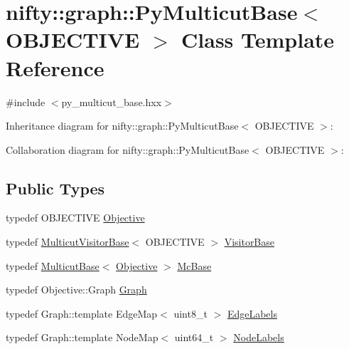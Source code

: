 \hypertarget{classnifty_1_1graph_1_1PyMulticutBase}{}\section{nifty\+:\+:graph\+:\+:Py\+Multicut\+Base$<$ O\+B\+J\+E\+C\+T\+I\+V\+E $>$ Class Template Reference}
\label{classnifty_1_1graph_1_1PyMulticutBase}


{\ttfamily \#include $<$py\+\_\+multicut\+\_\+base.\+hxx$>$}



Inheritance diagram for nifty\+:\+:graph\+:\+:Py\+Multicut\+Base$<$ O\+B\+J\+E\+C\+T\+I\+V\+E $>$\+:


Collaboration diagram for nifty\+:\+:graph\+:\+:Py\+Multicut\+Base$<$ O\+B\+J\+E\+C\+T\+I\+V\+E $>$\+:
\subsection*{Public Types}
\begin{DoxyCompactItemize}
\item 
typedef O\+B\+J\+E\+C\+T\+I\+V\+E \hyperlink{classnifty_1_1graph_1_1PyMulticutBase_ab2111d845c2163c0a7a4d9cccbe18458}{Objective}
\item 
typedef \hyperlink{namespacenifty_1_1graph_a33375e819f3dda82c6458bdc3cfbe81a}{Multicut\+Visitor\+Base}$<$ O\+B\+J\+E\+C\+T\+I\+V\+E $>$ \hyperlink{classnifty_1_1graph_1_1PyMulticutBase_ab8e429d9af32f127a62a886c523600e4}{Visitor\+Base}
\item 
typedef \hyperlink{classnifty_1_1graph_1_1MulticutBase}{Multicut\+Base}$<$ \hyperlink{classnifty_1_1graph_1_1MulticutBase_a7d014a4aa2d6e8fa3cd58b70b95ca829}{Objective} $>$ \hyperlink{classnifty_1_1graph_1_1PyMulticutBase_a687613abe29ca84ad5dc24e7bb072b83}{Mc\+Base}
\item 
typedef Objective\+::\+Graph \hyperlink{classnifty_1_1graph_1_1PyMulticutBase_adcef0a06c28d00ad248e6118b96c3630}{Graph}
\item 
typedef Graph\+::template Edge\+Map$<$ uint8\+\_\+t $>$ \hyperlink{classnifty_1_1graph_1_1PyMulticutBase_a3826da095b2a48866479f983673760d9}{Edge\+Labels}
\item 
typedef Graph\+::template Node\+Map$<$ uint64\+\_\+t $>$ \hyperlink{classnifty_1_1graph_1_1PyMulticutBase_af4707ea886ac9eefe9f755a4977a4eb0}{Node\+Labels}
\end{DoxyCompactItemize}
